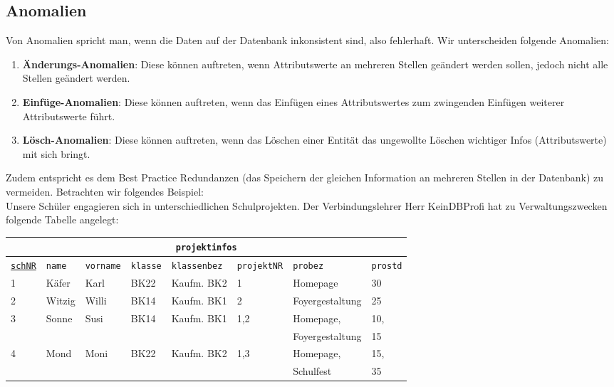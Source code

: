 \subsection[Anomalien]{Anomalien}\label{Anomalien}
Von Anomalien spricht man, wenn die Daten auf der Datenbank inkonsistent sind, also fehlerhaft. Wir unterscheiden folgende Anomalien:\\
\begin{tcolorbox}[title=Anomalien]
	\begin{enumerate}
		\item \textbf{Änderungs-Anomalien}: Diese können auftreten, wenn Attributswerte an mehreren Stellen geändert werden sollen, jedoch nicht alle Stellen geändert werden.
		\item \textbf{Einfüge-Anomalien}: Diese können auftreten, wenn das Einfügen eines Attributswertes zum zwingenden Einfügen weiterer Attributswerte führt.
		\item \textbf{Lösch-Anomalien}: Diese können auftreten, wenn das Löschen einer Entität das ungewollte Löschen wichtiger Infos (Attributswerte) mit sich bringt.
	\end{enumerate}
\end{tcolorbox}
Zudem entspricht es dem Best Practice Redundanzen (das Speichern der gleichen Information an mehreren Stellen in der Datenbank) zu vermeiden. Betrachten wir folgendes Beispiel:\\
Unsere Schüler engagieren sich in unterschiedlichen Schulprojekten. Der Verbindungslehrer Herr KeinDBProfi hat zu Verwaltungszwecken folgende Tabelle angelegt:
\begin{tabular}{llllllll}
	\multicolumn{8}{c}{\lstinline!projektinfos!}\\
	\hline
	\underline{\lstinline!schNR!}&\lstinline!name!&\lstinline!vorname!&\lstinline!klasse!&\lstinline!klassenbez!&\lstinline!projektNR!&\lstinline!probez!&\lstinline!prostd!\\
	\hline
	1 &
	Käfer &
	Karl &
	BK22 &
	Kaufm. BK2&
	1 &
	Homepage &
	30 \\
	2 &
	Witzig  &
	Willi &
	BK14 &
	Kaufm. BK1&
	2 &
	Foyergestaltung &
	25 \\
	3 &
	Sonne &
	Susi &
	BK14 &
	Kaufm. BK1&
	1,2 &
	Homepage,&
	10,\\
	&&&&&&Foyergestaltung&15\\
	4 &
	Mond &
	Moni &
	BK22 &
	Kaufm. BK2 &
	1,3 &
	Homepage,&
	15,  \\
	&&&&&&Schulfest&35\\
\end{tabular}\\
